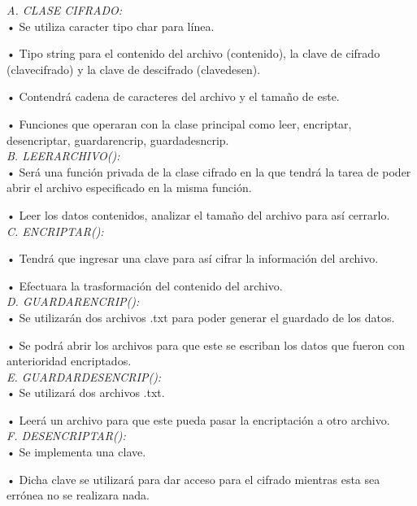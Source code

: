 \documentclass[9pt,24pt,twocolumn]{article}
\begin{document}
\textit{A.  CLASE CIFRADO: }
\\

{•	Se utiliza caracter tipo char para línea.}

{•	Tipo string para el contenido del archivo (contenido), la clave de cifrado (clavecifrado) y la clave de descifrado (clavedesen).}

{•	Contendrá cadena de caracteres del archivo y el tamaño de este.}

{•	Funciones que operaran con la clase principal como leer, encriptar, desencriptar, guardarencrip, guardadesncrip.}
\\

\textit{B.  LEERARCHIVO():}
\\

{•	Será una función privada de la clase cifrado en la que tendrá la tarea de poder abrir el archivo especificado en la misma función.}

{•	Leer los datos contenidos, analizar el tamaño del archivo para así cerrarlo.}
\\

\textit{C.  ENCRIPTAR():}

{•	Tendrá que ingresar una clave para así cifrar la información del archivo.}

{•	Efectuara la trasformación del contenido del archivo.}
\\

\textit{D.  GUARDARENCRIP():}
\\

{•	Se utilizarán dos archivos .txt para poder generar el guardado de los datos.}

{•	Se podrá abrir los archivos para que este se escriban los datos que fueron con anterioridad encriptados.}
\\

\textit{E.  GUARDARDESENCRIP():}
\\

{•	Se utilizará dos archivos .txt.}

{•	Leerá un archivo para que este pueda pasar la encriptación a otro archivo.}
\\

\textit{F.  DESENCRIPTAR():}
\\

{•	Se implementa una clave.}

{•	Dicha clave se utilizará para dar acceso para el cifrado mientras esta sea errónea no se realizara nada.}
\\
\end{document}
